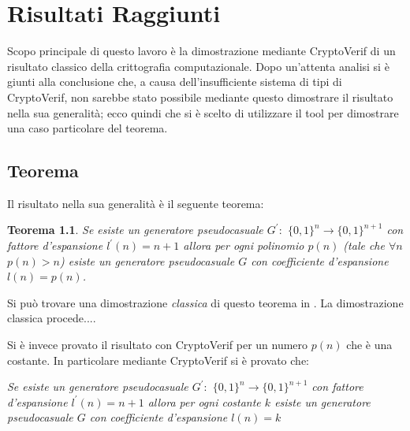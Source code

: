 \documentclass[a4paper,openright,twoside,12pt]{report}
\newtheorem{teorema}{Teorema}[chapter]
\begin{document}
\chapter{Risultati Raggiunti}
Scopo principale di questo lavoro \`e la dimostrazione mediante CryptoVerif di un risultato classico della crittografia computazionale.
Dopo un'attenta analisi si \`e giunti alla conclusione che, a causa dell'insufficiente sistema di tipi di CryptoVerif, non sarebbe stato
possibile mediante questo dimostrare il risultato nella sua generalit\`a; ecco quindi che si \`e scelto di utilizzare il tool
per dimostrare una caso particolare del teorema.
\section{Teorema}
Il risultato nella sua generalit\`a \`e il seguente teorema:
\begin{teorema}
Se esiste un generatore pseudocasuale $G^{'}:$ $\{0, 1\}^n \rightarrow \{0, 1\}^{n+1}$ con fattore 
d'espansione $l^{'}(n)=n+1$ allora per ogni polinomio $p(n)$ (tale che $\forall n$ $p(n)>n$)
esiste un generatore pseudocasuale $G$ con coefficiente d'espansione $l(n)=p(n)$.
\end{teorema}

Si pu\`o trovare una dimostrazione \emph{classica} di questo teorema in \cite{1206501}. La dimostrazione classica procede....

Si \`e invece provato il risultato con CryptoVerif per un numero $p(n)$ che \`e una costante. In particolare mediante CryptoVerif si \`e provato
che:
\begin{center}
\emph{Se esiste un generatore pseudocasuale $G^{'}:$ $\{0, 1\}^n \rightarrow \{0, 1\}^{n+1}$ 
con fattore d'espansione $l^{'}(n)=n+1$ allora per ogni costante $k$ esiste un generatore 
pseudocasuale $G$ con coefficiente d'espansione $l(n)=k$}
\end{center}


\newpage
\end{document}
